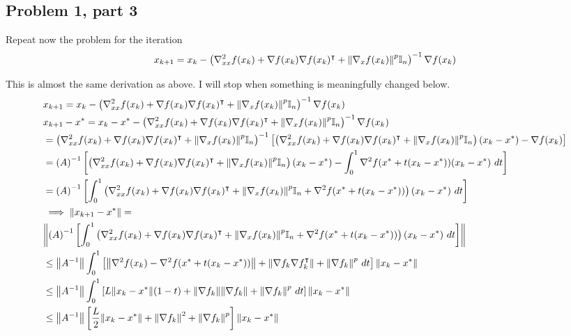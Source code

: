 \subsection{Problem 1, part 3}
Repeat now the problem for the iteration
\[x_{k+1} = x_k - \left( \nabla^2_{xx}f(x_k) + \nabla f(x_k) \nabla f(x_k)^\intercal + \norm{\nabla_x f(x_k)}^p \mathbb{I}_n\right)^{-1} \nabla f(x_k)\]
\partbreak
\begin{solution}

    This is almost the same derivation as above. I will stop when something is meaningfully changed below.
{\footnotesize
    \begin{align*}
        &x_{k+1} = x_k - \left( \grad^2_{xx}f(x_k) + \grad f(x_k) \grad f(x_k)\T + \norm{\grad_x f(x_k)}^p \id_n\right)\inv \grad f(x_k)\\
        &x_{k+1} - x\star = x_k -x\star - \left( \grad^2_{xx}f(x_k) + \grad f(x_k) \grad f(x_k)\T + \norm{\grad_x f(x_k)}^p \id_n\right)\inv \grad f(x_k)\\
        &= \left( \grad^2_{xx}f(x_k) + \grad f(x_k) \grad f(x_k)\T + \norm{\grad_x f(x_k)}^p \id_n\right)\inv \left[\left( \grad^2_{xx}f(x_k) + \grad f(x_k) \grad f(x_k)\T + \norm{\grad_x f(x_k)}^p \id_n\right)(x_k -x\star) - \grad f(x_k)\right]\\
        &= \left( A\right)\inv \left[\left( \grad^2_{xx}f(x_k) + \grad f(x_k) \grad f(x_k)\T + \norm{\grad_x f(x_k)}^p \id_n\right)(x_k -x\star) - \int_0^1\grad^2 f(x\star + t(x_k - x\star))(x_k - x\star) \ dt\right]\\
        &= \left( A\right)\inv \left[ \int_0^1 \left( \grad^2_{xx}f(x_k) + \grad f(x_k) \grad f(x_k)\T + \norm{\grad_x f(x_k)}^p \id_n + \grad^2 f(x\star + t(x_k - x\star))\right)(x_k - x\star) \ dt\right]\\
        &\implies \norm{x_{k+1} - x\star}=\\
        &\norm{\left( A\right)\inv \left[ \int_0^1 \left( \grad^2_{xx}f(x_k) + \grad f(x_k) \grad f(x_k)\T + \norm{\grad_x f(x_k)}^p \id_n + \grad^2 f(x\star + t(x_k - x\star))\right)(x_k - x\star) \ dt\right]}\\
        &\leq \norm{A\inv} \int_0^1 \left[ \norm{\grad^2f(x_k) - \grad^2f(x\star + t(x_k - x\star))} + \norm{\grad f_k \grad f_k\T} + \norm{\grad f_k}^p \ dt \right]\norm{x_k - x\star}\\
        &\leq \norm{A\inv} \int_0^1 \left[ L \norm{x_k - x\star}(1 - t) + \norm{\grad f_k }\norm{\grad f_k } + \norm{\grad f_k}^p \ dt \right]\norm{x_k - x\star}\\
        &\leq \norm{A\inv}  \left[ \frac{L}{2} \norm{x_k - x\star} + \norm{\grad f_k}^2 + \norm{\grad f_k}^p\right]\norm{x_k - x\star}\\

\end{align*}}
\end{solution}

